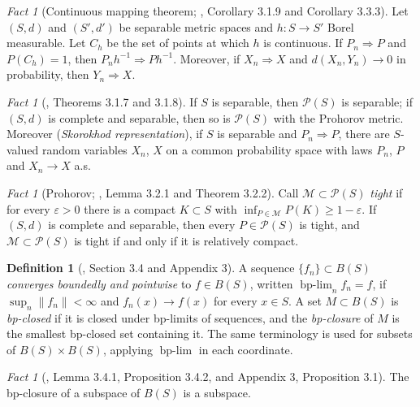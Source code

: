\documentclass[11pt,a4paper]{article}
\theoremstyle{plain}
\theoremstyle{definition}
\newtheorem{definition}[theorem]{Definition}
\theoremstyle{remark}
\newtheorem{fact}[theorem]{Fact}
\newcommand{\Bdd}{B}                           %
\newcommand{\Prob}{\mathcal{P}}                %
\newcommand{\bplim}{\operatorname{bp-lim}}
\DeclareMathOperator*{\wto}{\Rightarrow}
\newcommand{\EK}{\cite{EK86}}
\begin{document}
\begin{fact}[Continuous mapping theorem; \EK, Corollary 3.1.9 and Corollary 3.3.3]
  \label{fact:cmt}
  Let $(S,d)$ and $(S',d')$ be separable metric spaces and $h : S \to S'$ Borel
  measurable.  Let $C_h$ be the set of points at which $h$ is continuous.  If
  $P_n \wto P$ and $P(C_h) = 1$, then $P_n h^{-1} \wto P h^{-1}$.  Moreover, if
  $X_n \wto X$ and $d(X_n, Y_n) \to 0$ in probability, then $Y_n \wto X$.
\end{fact}

\begin{fact}[\EK, Theorems 3.1.7 and 3.1.8]
  \label{fact:PSpolish}
  If $S$ is separable, then $\Prob(S)$ is separable; if $(S,d)$ is complete and
  separable, then so is $\Prob(S)$ with the Prohorov metric.  Moreover
  (\emph{Skorokhod representation}), if $S$ is separable and $P_n \wto P$, there
  are $S$-valued random variables $X_n$, $X$ on a common probability space with
  laws $P_n$, $P$ and $X_n \to X$ a.s.
\end{fact}

\begin{fact}[Prohorov; \EK, Lemma 3.2.1 and Theorem 3.2.2]
  \label{fact:prohorov}
  Call $\mathcal{M} \subset \Prob(S)$ \emph{tight} if for every
  $\varepsilon > 0$ there is a compact $K \subset S$ with
  $\inf_{P \in \mathcal{M}} P(K) \geq 1 - \varepsilon$.  If $(S,d)$ is complete
  and separable, then every $P \in \Prob(S)$ is tight, and
  $\mathcal{M} \subset \Prob(S)$ is tight if and only if it is relatively
  compact.
\end{fact}

\begin{definition}[\EK, Section 3.4 and Appendix 3]
  \label{def:bp}
  A sequence $\{f_n\} \subset \Bdd(S)$ \emph{converges boundedly and pointwise}
  to $f \in \Bdd(S)$, written $\bplim_n f_n = f$, if $\sup_n \lVert f_n \rVert
  < \infty$ and $f_n(x) \to f(x)$ for every $x \in S$.  A set
  $M \subset \Bdd(S)$ is \emph{bp-closed} if it is closed under bp-limits of
  sequences, and the \emph{bp-closure} of $M$ is the smallest bp-closed set
  containing it.  The same terminology is used for subsets of
  $\Bdd(S) \times \Bdd(S)$, applying $\bplim$ in each coordinate.
\end{definition}

\begin{fact}[\EK, Lemma 3.4.1, Proposition 3.4.2, and Appendix 3, Proposition 3.1]
  \label{fact:bp}
  The bp-closure of a subspace of $\Bdd(S)$ is a subspace.
\end{fact}
\end{document}
